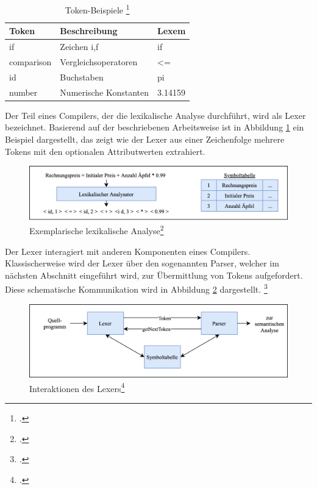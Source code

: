 \begin{table}[!ht]
\begin{tabularx}{\textwidth}{|l|X|l|}
\hline

   \textbf{Token} & \textbf{Beschreibung} & \textbf{Lexem} \\
\hline
if             & Zeichen i,f           & if                      \\ 
comparison     & Vergleichsoperatoren  & \textless{}=            \\ 
id             & Buchstaben            & pi                      \\ 
number         & Numerische Konstanten    & 3.14159               \\    
\hline

\end{tabularx}
\caption[Token-Beispiele]{Token-Beispiele \protect\footcite{Ullmann2008}}
 \label{tab:Tokens}
\end{table}

Der Teil eines Compilers,  der die lexikalische Analyse durchführt,  wird als Lexer bezeichnet.  Basierend auf der beschriebenen Arbeitsweise ist in Abbildung \ref{fig:LexerResult} ein Beispiel dargestellt, das zeigt wie der Lexer aus einer Zeichenfolge mehrere Tokens mit den optionalen Attributwerten extrahiert.  
 
\begin{figure}[!ht]
 \includegraphics[width=\textwidth,keepaspectratio]{Images/Compiler/LexerResult.png}
 \caption[Exemplarische lexikalische Analyse]{Exemplarische lexikalische Analyse\protect\footcite{Ullmann2008}}
 \label{fig:LexerResult}
\end{figure}

Der Lexer interagiert mit anderen Komponenten eines Compilers.  Klassischerweise wird der Lexer über den sogenannten Parser, welcher im nächsten Abschnitt eingeführt wird,  zur Übermittlung von Tokens aufgefordert.  Diese schematische Kommunikation wird in  Abbildung \ref{fig:LexerInteraktionen} dargestellt.  \footcite[Vgl.][S. 135]{Ullmann2008} 

\newpage
\begin{figure}[!ht]
 \includegraphics[width=\textwidth,keepaspectratio]{Images/Compiler/LexerParser.png}
 \caption[Interaktionen des Lexers]{Interaktionen des Lexers\protect\footcite{Ullmann2008}}
 \label{fig:LexerInteraktionen}
\end{figure}

